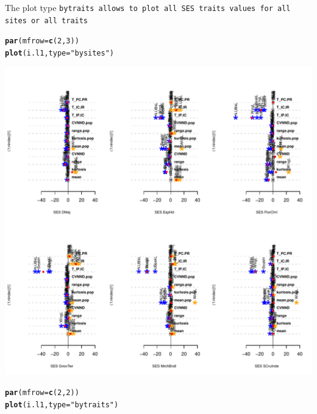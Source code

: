 \documentclass[12pt]{article}\usepackage[]{graphicx}\usepackage[]{color}
\makeatletter
\def\maxwidth{ %
  \ifdim\Gin@nat@width>\linewidth
    \linewidth
  \else
    \Gin@nat@width
  \fi
}
\newcommand{\hlnum}[1]{\textcolor[rgb]{0.686,0.059,0.569}{#1}}%
\newcommand{\hlstr}[1]{\textcolor[rgb]{0.192,0.494,0.8}{#1}}%
\newcommand{\hlstd}[1]{\textcolor[rgb]{0.345,0.345,0.345}{#1}}%
\newcommand{\hlkwc}[1]{\textcolor[rgb]{0.333,0.667,0.333}{#1}}%
\newcommand{\hlkwd}[1]{\textcolor[rgb]{0.737,0.353,0.396}{\textbf{#1}}}%
\newenvironment{kframe}{%
 \def\at@end@of@kframe{}%
 \ifinner\ifhmode%
  \def\at@end@of@kframe{\end{minipage}}%
  \begin{minipage}{\columnwidth}%
 \fi\fi%
 \def\FrameCommand##1{\hskip\@totalleftmargin \hskip-\fboxsep
 \colorbox{shadecolor}{##1}\hskip-\fboxsep
     \hskip-\linewidth \hskip-\@totalleftmargin \hskip\columnwidth}%
 \MakeFramed {\advance\hsize-\width
   \@totalleftmargin\z@ \linewidth\hsize
   \@setminipage}}%
 {\par\unskip\endMakeFramed%
 \at@end@of@kframe}
\newenvironment{knitrout}{}{} %
\makeatother
\begin{document}
The plot type \tt{bytraits} allows to plot all SES traits values for all sites or all traits
\begin{knitrout}
\color{fgcolor}\begin{kframe}
\begin{alltt}
\hlkwd{par}\hlstd{(}\hlkwc{mfrow}\hlstd{=}\hlkwd{c}\hlstd{(}\hlnum{2}\hlstd{,}\hlnum{3}\hlstd{))}
\hlkwd{plot}\hlstd{(i.l1,}\hlkwc{type}\hlstd{=}\hlstr{"bysites"}\hlstd{)}
\end{alltt}
\end{kframe}
\includegraphics[width=\maxwidth]{figure/unnamed-chunk-421} 
\begin{kframe}\begin{alltt}
\hlkwd{par}\hlstd{(}\hlkwc{mfrow}\hlstd{=}\hlkwd{c}\hlstd{(}\hlnum{2}\hlstd{,}\hlnum{2}\hlstd{))}
\hlkwd{plot}\hlstd{(i.l1,}\hlkwc{type}\hlstd{=}\hlstr{"bytraits"}\hlstd{)}
\end{alltt}
\end{kframe}

\end{knitrout}
\end{document}
